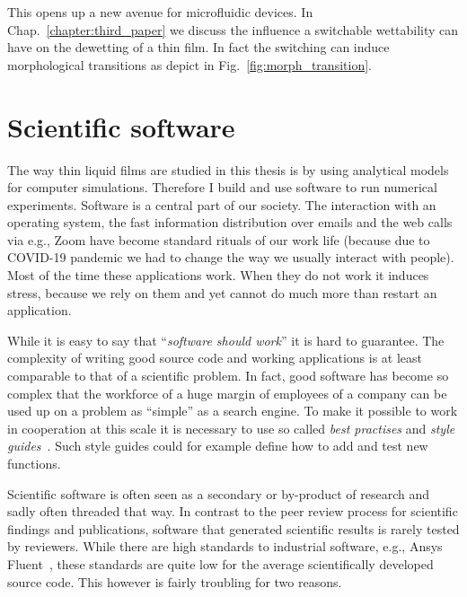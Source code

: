 This opens up a new avenue for microfluidic devices.
In Chap.~\ref{chapter:third_paper} we discuss the influence a switchable wettability can have on the dewetting of a thin film.
In fact the switching can induce morphological transitions as depict in Fig.~\ref{fig:morph_transition}. 

\section{Scientific software}
\label{section:statement_software}
The way thin liquid films are studied in this thesis is by using analytical models for computer simulations.
Therefore I build and use software to run numerical experiments.
Software is a central part of our society.
The interaction with an operating system, the fast information distribution over emails and the web calls via e.g., Zoom have become standard rituals of our work life (because due to COVID-19 pandemic we had to change the way we usually interact with people).
Most of the time these applications work.
When they do not work it induces stress, because we rely on them and yet cannot do much more than restart an application.

While it is easy to say that ``\textit{software should work}'' it is hard to guarantee.
The complexity of writing good source code and working applications is at least comparable to that of a scientific problem.
In fact, good software has become so complex that the workforce of a huge margin of employees of a company can be used up on a problem as ``simple'' as a search engine.
To make it possible to work in cooperation at this scale it is necessary to use so called \textit{best practises} and \textit{style guides}~\cite{sommervilleSoftwareEngineering2015}.
Such style guides could for example define how to add and test new functions.

Scientific software is often seen as a secondary or by-product of research and sadly often threaded that way.
In contrast to the peer review process for scientific findings and publications, software that generated scientific results is rarely tested by reviewers.  
While there are high standards to industrial software, e.g., Ansys Fluent~\cite{matssonIntroductionANSYSFluent2022}, these standards are quite low for the average scientifically developed source code.
This however is fairly troubling for two reasons.

